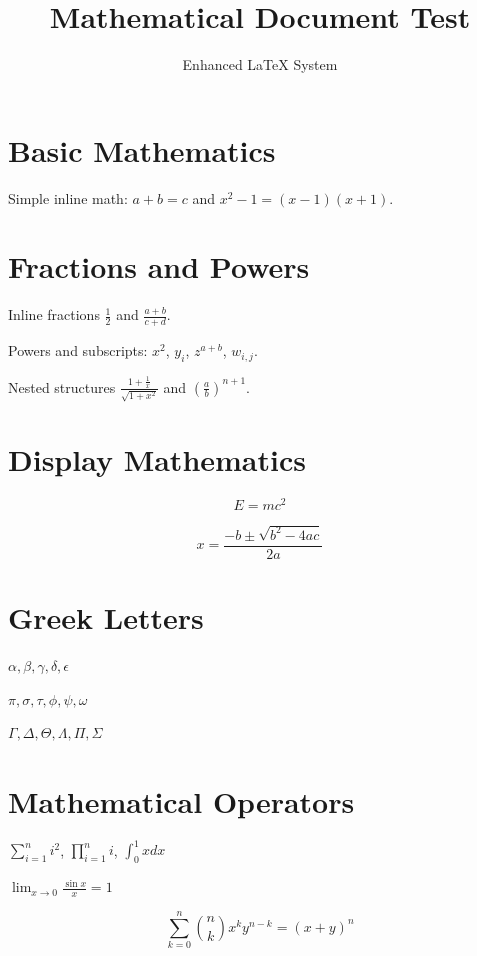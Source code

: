 \documentclass[12pt]{article}
\title{Mathematical Document Test}
\author{Enhanced LaTeX System}
\begin{document}
\maketitle

\section{Basic Mathematics}

Simple inline math: $a + b = c$ and $x^2 - 1 = (x-1)(x+1)$.

\section{Fractions and Powers}

Inline fractions $\frac{1}{2}$ and $\frac{a+b}{c+d}$.

Powers and subscripts: $x^2$, $y_i$, $z^{a+b}$, $w_{i,j}$.

Nested structures $\frac{1+\frac{1}{x}}{\sqrt{1+x^2}}$ and
$\left(\frac{a}{b}\right)^{n+1}$.

\section{Display Mathematics}

\begin{equation}
E = mc^2
\end{equation}

\begin{equation}
x = \frac{-b \pm \sqrt{b^2 - 4ac}}{2a}
\end{equation}

\section{Greek Letters}

$\alpha, \beta, \gamma, \delta, \epsilon$

$\pi, \sigma, \tau, \phi, \psi, \omega$

$\Gamma, \Delta, \Theta, \Lambda, \Pi, \Sigma$

\section{Mathematical Operators}

$\sum_{i=1}^n i^2$, $\prod_{i=1}^n i$, $\int_0^1 x dx$

$\lim_{x \to 0} \frac{\sin x}{x} = 1$

\begin{equation}
\sum_{k=0}^{n} \binom{n}{k} x^k y^{n-k} = (x+y)^n
\end{equation}
\end{document}
